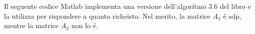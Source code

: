 \begin{center}
\footnotesize\noindent{}\end{center}

\noindent Il seguente codice Matlab implementa una versione dell'algoritmo 3.6 del libro e la utilizza per rispondere a quanto richeisto. Nel merito, la matrice \(A_1\) \'e sdp, mentre la matrice \(A_2\) non lo \'e.


